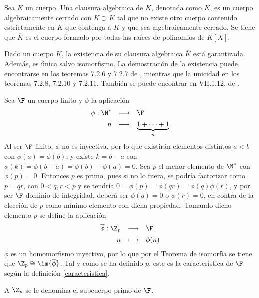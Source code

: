 \begin{deff}{\cite[p.~92]{Rosenberger}}
Sea $K$ un cuerpo. Una clausura algebraica de $K$, denotada como $\overline{K}$, es un cuerpo algebraicamente cerrado con $\overline{K} \supset K$ tal que no existe otro cuerpo contenido estrictamente en $\overline{K}$ que contenga a $K$ y que sea algebraicamente cerrado. Se tiene que $\overline{K}$ es el cuerpo formado por todas las raíces de polinomios de $K[X]$.\cite[VII.1.9.]{GamboaAnillos}

\item Dado un cuerpo $K$, la existencia de su clausura algebraica $\overline{K}$ está garantizada. Además, es única salvo isomorfismo. La demostración de la existencia puede encontrarse en los teoremas 7.2.6 y 7.2.7 de \cite{Rosenberger}, mientras que la unicidad en los teoremas 7.2.8, 7.2.10 y 7.2.11. También se puede encontrar en VII.1.12. de \cite{GamboaAnillos}.
\end{deff}

\begin{prop}\label{caracteristica_primo}
\end{prop}

\begin{dem}{\cite[p.~411]{GamboaAnillos}}
    Sea $\F$ un cuerpo finito y $\phi$ la aplicación
    \[
    \begin{array}{rcl}
    \phi : \N^* & \longrightarrow & \F \\[1ex]
            n & \longmapsto & \underbrace{1 +  \cdots + 1}_{n}
    \end{array}
    \]
    Al ser $\F$ finito, $\phi$ no es inyectiva, por lo que existirán elementos distintos $a<b$ con $\phi(a) = \phi (b)$, y existe $k = b-a$ con $\phi(k) = \phi(b-a) = \phi (b) - \phi (a) = 0$. Sea $p$ el menor elemento de $\N^*$ con $\phi(p) = 0$. Entonces $p$ es primo, pues si no lo fuera, se podría factorizar como $p = qr$, con $0<q,r<p$ y se tendría $0 = \phi(p) = \phi(qr) = \phi(q)\phi(r)$, y por ser $\F$ dominio de integridad, deberá ser $\phi(q) = 0$ o $\phi(r) = 0$, en contra de la elección de $p$ como mínimo elemento con dicha propiedad. Tomando dicho elemento $p$ se define la aplicación 
    \[
    \begin{array}{rcl}
    \overline{\phi} : \Z_p & \longrightarrow & \F \\[1ex]
            n & \longmapsto & \phi(n)
    \end{array}
    \]
    $\overline{\phi}$ es un homomorfismo inyectivo, por lo que por el Teorema de isomorfía se tiene que $\Z_p \cong \im{\overline{\phi}}$. Tal y como se ha definido $p$, este es la característica de $\F$ según la definición \ref{caracteristica}.
    
    A $\Z_p$ se le denomina el subcuerpo primo de $\F$. 
    
\end{dem}

